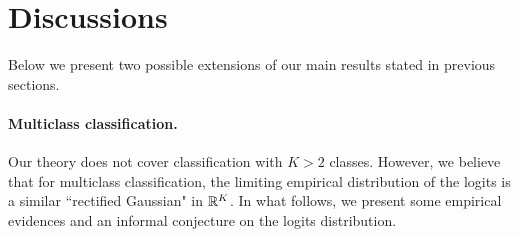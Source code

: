 \section{Discussions}\label{sec:discuss}


Below we present two possible extensions of our main results stated in previous sections.

\paragraph{Multiclass classification.} Our theory does not cover classification with $K > 2$ classes. However, we believe that for multiclass classification, the limiting empirical distribution of the logits is a similar ``rectified Gaussian" in $\mathbb{R}^K$. In what follows, we present some empirical evidences and an informal conjecture on the logits distribution.

